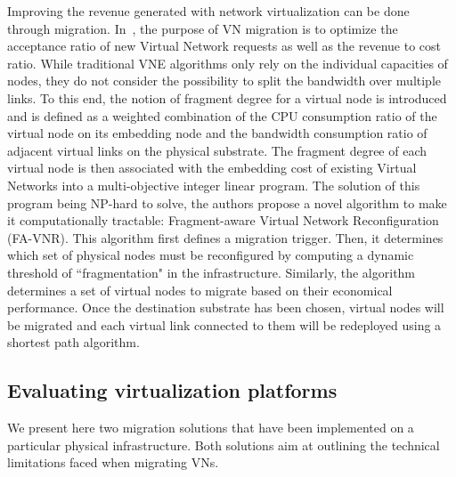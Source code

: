 Improving the revenue generated with network virtualization can be done through migration.
In~\cite{fragment-Liu2018}, the purpose of VN migration is to optimize the acceptance ratio of new Virtual Network requests as well as the revenue to cost ratio.
While traditional VNE algorithms only rely on the individual capacities of nodes, they do not consider the possibility to split the bandwidth over multiple links.
To this end, the notion of fragment degree for a virtual node is introduced and is defined as a weighted combination of the CPU consumption ratio of the virtual node on its embedding node and the bandwidth consumption ratio of adjacent virtual links on the physical substrate.
The fragment degree of each virtual node is then associated with the embedding cost of existing Virtual Networks into a multi-objective integer linear program. The solution of this program being NP-hard to solve, the authors propose a novel algorithm to make it computationally tractable: Fragment-aware Virtual Network Reconfiguration (FA-VNR).
This algorithm first defines a migration trigger. 
Then, it determines which set of physical nodes must be reconfigured by computing a dynamic threshold of ``fragmentation" in the infrastructure.
Similarly, the algorithm determines a set of virtual nodes to migrate based on their economical performance.
Once the destination substrate has been chosen, virtual nodes will be migrated and each virtual link connected to them will be redeployed using a shortest path algorithm.

\subsection{Evaluating virtualization platforms}
We present here two migration solutions that have been implemented on a particular physical infrastructure.
Both solutions aim at outlining the technical limitations faced when migrating VNs.


